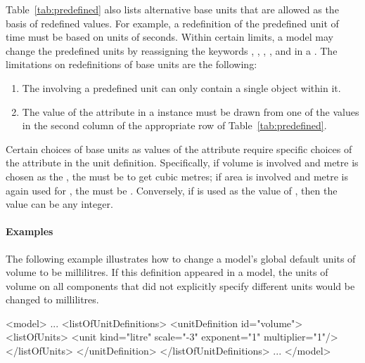 Table~\ref{tab:predefined} also lists alternative base units that are
allowed as the basis of redefined values.  For example, a
redefinition of the predefined unit of time must be based on units
of seconds.  Within certain limits, a model may change the
predefined units by reassigning the keywords ,
, , , and  in
a \UnitDefinition.  The limitations on redefinitions of base units
are the following:
\begin{enumerate}

\item The \UnitDefinition involving a predefined unit can only
  contain a single \Unit object within it.

\item The value of the  attribute in
  a \Unit instance must be drawn from one of the values
    in the second column of the appropriate row of
    Table~\ref{tab:predefined}.


\end{enumerate}



Certain choices of base units as values of the 
attribute require specific choices of the 
attribute in the unit definition.  Specifically, if volume is
involved and metre is chosen as the , the
 must be  to get cubic metres; if area is
involved and metre is again used for , the
 must be .  Conversely, if
 is used as the value of , then
the  value can be any integer.




\paragraph{Examples}

The following example illustrates how to change a model's
  global default units
of volume to be millilitres.  If this definition appeared in a
model, the units of volume on all components that did not
explicitly specify different units would be changed to
millilitres.
\begin{example}
<model>
    ...
    <listOfUnitDefinitions>
        <unitDefinition id="volume">
            <listOfUnits>
                <unit kind="litre" scale="-3" exponent="1" multiplier="1"/>
            </listOfUnits>
        </unitDefinition>
    </listOfUnitDefinitions>
    ...
</model>
\end{example}


